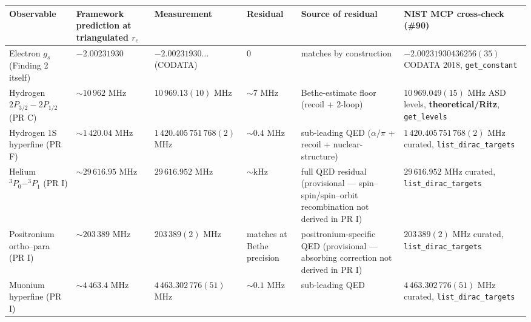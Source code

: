 \begin{center}
\renewcommand{\arraystretch}{1.15}
\scriptsize
\begin{longtable}{p{2.5cm}p{2.0cm}p{2.0cm}p{1.0cm}p{2.5cm}p{2.5cm}}
\toprule
\textbf{Observable} & \textbf{Framework prediction at triangulated $r_e$}
                    & \textbf{Measurement} & \textbf{Residual}
                    & \textbf{Source of residual}
                    & \textbf{NIST MCP cross-check (\#90)} \\
\midrule \endhead

Electron $g_s$
  (Finding 2 itself)
  & $-2.00231930$
  & $-2.00231930\dots$ (CODATA)
  & $0$
  & matches by construction
  & $-2.00231930436256(35)$ \newline CODATA 2018, \texttt{get\_constant} \\
\midrule

Hydrogen $2P_{3/2}{-}2P_{1/2}$ (PR C)
  & $\sim 10\,962$ MHz
  & $10\,969.13(10)$ MHz
  & $\sim 7$ MHz
  & Bethe-estimate floor (recoil + 2-loop)
  & $10\,969.049(15)$ MHz \newline ASD levels, \textbf{theoretical/Ritz},
    \texttt{get\_levels} \\
\midrule

Hydrogen 1S hyperfine (PR F)
  & $\sim 1\,420.04$ MHz
  & $1\,420.405\,751\,768(2)$ MHz
  & $\sim 0.4$ MHz
  & sub-leading QED ($\alpha/\pi$ + recoil + nuclear-structure)
  & $1\,420.405\,751\,768(2)$ MHz \newline curated,
    \texttt{list\_dirac\_targets} \\
\midrule

Helium $^3P_0{-}^3P_1$ (PR I)
  & $\sim 29\,616.95$ MHz
  & $29\,616.952$ MHz
  & $\sim$kHz
  & full QED residual (provisional --- spin--spin/spin--orbit
    recombination not derived in PR I)
  & $29\,616.952$ MHz \newline curated,
    \texttt{list\_dirac\_targets} \\
\midrule

Positronium ortho--para (PR I)
  & $\sim 203\,389$ MHz
  & $203\,389(2)$ MHz
  & matches at Bethe precision
  & positronium-specific QED (provisional --- absorbing correction not
    derived in PR I)
  & $203\,389(2)$ MHz \newline curated,
    \texttt{list\_dirac\_targets} \\
\midrule

Muonium hyperfine (PR I)
  & $\sim 4\,463.4$ MHz
  & $4\,463.302\,776(51)$ MHz
  & $\sim 0.1$ MHz
  & sub-leading QED
  & $4\,463.302\,776(51)$ MHz \newline curated,
    \texttt{list\_dirac\_targets} \\
\bottomrule
\end{longtable}
\end{center}

